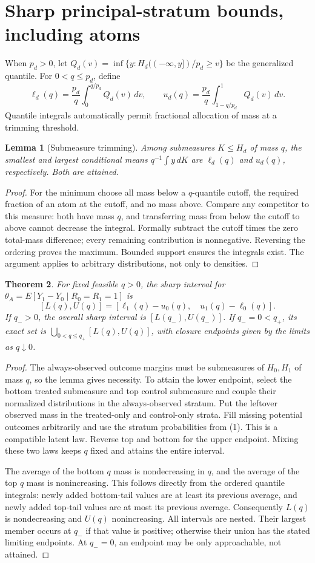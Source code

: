 \documentclass[11pt,a4paper]{article}
\newtheorem{theorem}{Theorem}[section]
\newtheorem{lemma}[theorem]{Lemma}
\begin{document}
\section{Sharp principal-stratum bounds, including atoms}
When $p_d>0$, let $Q_d(v)=\inf\{y:H_d(({-\infty},y])/p_d\ge v\}$ be the generalized quantile. For $0<q\le p_d$, define
\[
 \ell_d(q)=\frac{p_d}{q}\int_0^{q/p_d}Q_d(v)\,dv,
 \qquad
 u_d(q)=\frac{p_d}{q}\int_{1-q/p_d}^1Q_d(v)\,dv.             \tag{3}
\]
Quantile integrals automatically permit fractional allocation of mass at a trimming threshold.
\begin{lemma}[Submeasure trimming]
Among submeasures $K\le H_d$ of mass $q$, the smallest and largest conditional means $q^{-1}\int y\,dK$ are $\ell_d(q)$ and $u_d(q)$, respectively. Both are attained.
\end{lemma}
\begin{proof}
For the minimum choose all mass below a $q$-quantile cutoff, the required fraction of an atom at the cutoff, and no mass above. Compare any competitor to this measure: both have mass $q$, and transferring mass from below the cutoff to above cannot decrease the integral. Formally subtract the cutoff times the zero total-mass difference; every remaining contribution is nonnegative. Reversing the ordering proves the maximum. Bounded support ensures the integrals exist. The argument applies to arbitrary distributions, not only to densities.
\end{proof}
\begin{theorem}
For fixed feasible $q>0$, the sharp interval for
$\theta_A=E[Y_1-Y_0\mid R_0=R_1=1]$ is
\[
 [L(q),U(q)]=[\ell_1(q)-u_0(q),\quad u_1(q)-\ell_0(q)].      \tag{4}
\]
If $q_->0$, the overall sharp interval is $[L(q_-),U(q_-)]$. If $q_-=0<q_+$, its exact set is
$\bigcup_{0<q\le q_+}[L(q),U(q)]$, with closure endpoints given by the limits as $q\downarrow0$.
\end{theorem}
\begin{proof}
The always-observed outcome margins must be submeasures of $H_0,H_1$ of mass $q$, so the lemma gives necessity. To attain the lower endpoint, select the bottom treated submeasure and top control submeasure and couple their normalized distributions in the always-observed stratum. Put the leftover observed mass in the treated-only and control-only strata. Fill missing potential outcomes arbitrarily and use the stratum probabilities from (1). This is a compatible latent law. Reverse top and bottom for the upper endpoint. Mixing these two laws keeps $q$ fixed and attains the entire interval.

The average of the bottom $q$ mass is nondecreasing in $q$, and the average of the top $q$ mass is nonincreasing. This follows directly from the ordered quantile integrals: newly added bottom-tail values are at least its previous average, and newly added top-tail values are at most its previous average. Consequently $L(q)$ is nondecreasing and $U(q)$ nonincreasing. All intervals are nested. Their largest member occurs at $q_-$ if that value is positive; otherwise their union has the stated limiting endpoints. At $q_-=0$, an endpoint may be only approachable, not attained.
\end{proof}
\end{document}
